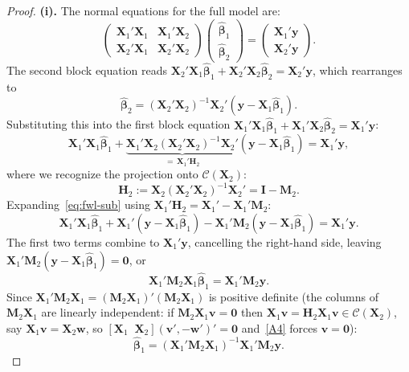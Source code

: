 \documentclass[14pt]{extarticle}
\theoremstyle{plain}
\theoremstyle{definition}
\theoremstyle{remark}
\newcommand{\bX}{\mathbf{X}}
\newcommand{\by}{\mathbf{y}}
\def\bb{\boldsymbol{\beta}}
\newcommand{\bI}{\mathbf{I}}
\newcommand{\bH}{\mathbf{H}}
\newcommand{\bM}{\mathbf{M}}
\newcommand{\bzero}{\mathbf{0}}
\newcommand{\bw}{\mathbf{w}}
\newcommand{\bv}{\mathbf{v}}
\newcommand{\calC}{\mathcal{C}}
\begin{document}
\begin{proof}
\textbf{(i).} The normal equations for the full model are:
\[
\begin{pmatrix} \bX_1'\bX_1 & \bX_1'\bX_2 \\ \bX_2'\bX_1 & \bX_2'\bX_2 \end{pmatrix} \begin{pmatrix} \hat{\bb}_1 \\ \hat{\bb}_2 \end{pmatrix} = \begin{pmatrix} \bX_1'\by \\ \bX_2'\by \end{pmatrix}.
\]
The second block equation reads $\bX_2'\bX_1\hat{\bb}_1 + \bX_2'\bX_2\hat{\bb}_2 = \bX_2'\by$, which rearranges to
\[
\hat{\bb}_2 = (\bX_2'\bX_2)^{-1}\bX_2'(\by - \bX_1\hat{\bb}_1).
\]
Substituting this into the first block equation $\bX_1'\bX_1\hat{\bb}_1 + \bX_1'\bX_2\hat{\bb}_2 = \bX_1'\by$:
\begin{equation}\label{eq:fwl-sub}
\bX_1'\bX_1\hat{\bb}_1 + \underbrace{\bX_1'\bX_2(\bX_2'\bX_2)^{-1}\bX_2'}_{=\,\bX_1'\bH_2}(\by - \bX_1\hat{\bb}_1) = \bX_1'\by,
\end{equation}
where we recognize the projection onto $\calC(\bX_2)$:
\[
\bH_2 := \bX_2(\bX_2'\bX_2)^{-1}\bX_2' = \bI - \bM_2.
\]
Expanding~\eqref{eq:fwl-sub} using $\bX_1'\bH_2 = \bX_1' - \bX_1'\bM_2$:
\[
\bX_1'\bX_1\hat{\bb}_1 + \bX_1'(\by - \bX_1\hat{\bb}_1) - \bX_1'\bM_2(\by - \bX_1\hat{\bb}_1) = \bX_1'\by.
\]
The first two terms combine to $\bX_1'\by$, cancelling the right-hand side, leaving $\bX_1'\bM_2(\by - \bX_1\hat{\bb}_1) = \bzero$, or
\[
\bX_1'\bM_2\bX_1\hat{\bb}_1 = \bX_1'\bM_2\by.
\]
Since $\bX_1'\bM_2\bX_1 = (\bM_2\bX_1)'(\bM_2\bX_1)$ is positive definite (the columns of $\bM_2\bX_1$ are linearly independent: if $\bM_2\bX_1\bv = \bzero$ then $\bX_1\bv = \bH_2\bX_1\bv \in \calC(\bX_2)$, say $\bX_1\bv = \bX_2\bw$, so $[\bX_1 \;\; \bX_2](\bv', -\bw')' = \bzero$ and~\ref{A4} forces $\bv = \bzero$):
\[
\hat{\bb}_1 = (\bX_1'\bM_2\bX_1)^{-1}\bX_1'\bM_2\by.
\]


\end{proof}
\end{document}
